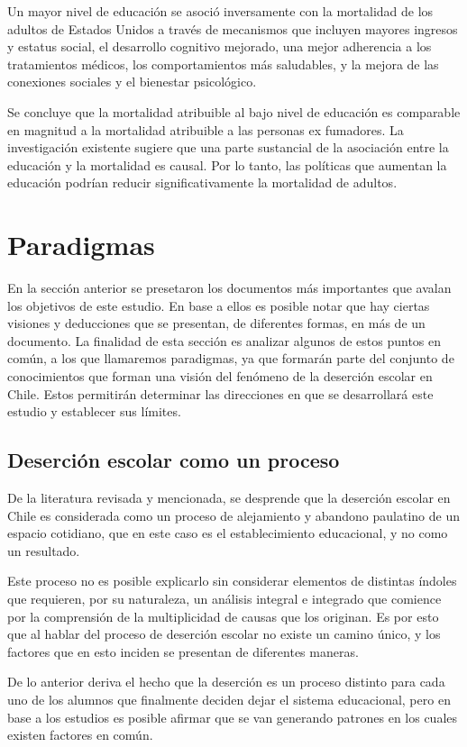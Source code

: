 Un mayor nivel de educación se asoció inversamente con la mortalidad de los adultos de Estados Unidos a través de mecanismos que incluyen mayores ingresos y estatus social, el desarrollo cognitivo mejorado, una mejor adherencia a los tratamientos médicos, los comportamientos más saludables, y la mejora de las conexiones sociales y el bienestar psicológico.

Se concluye que la mortalidad atribuible al bajo nivel de educación es comparable en magnitud a la mortalidad atribuible a las personas ex fumadores. La investigación existente sugiere que una parte sustancial de la asociación entre la educación y la mortalidad es causal. Por lo tanto, las políticas que aumentan la educación podrían reducir significativamente la mortalidad de adultos.

\section{Paradigmas}
En la sección anterior se presetaron los documentos más importantes que avalan los objetivos de este estudio. 
En base a ellos es posible notar que hay ciertas visiones y deducciones que se presentan, de diferentes formas, en más de un documento. La finalidad de esta sección es analizar algunos de estos puntos en común, a los que llamaremos paradigmas, ya que formarán parte del conjunto de conocimientos que forman una visión del fenómeno de la deserción escolar en Chile. Estos permitirán determinar las direcciones en que se desarrollará este estudio y establecer sus límites. 

\subsection{Deserción escolar como un proceso}
De la literatura revisada y mencionada, se desprende que la deserción escolar en Chile es considerada como un proceso de alejamiento y abandono paulatino de un espacio cotidiano, que en este caso es el establecimiento educacional, y no como un resultado.

Este proceso no es posible explicarlo sin considerar elementos de distintas índoles que requieren, por su naturaleza, un análisis integral e integrado que comience por la comprensión de la multiplicidad de causas que los originan. Es por esto que al hablar del proceso de deserción escolar no existe un camino único, y los factores que en esto inciden se presentan de diferentes maneras.

De lo anterior deriva el hecho que la deserción es un proceso distinto para cada uno de los alumnos que finalmente deciden dejar el sistema educacional, pero en base a los estudios es posible afirmar que se van generando patrones en los cuales existen factores en común. 

